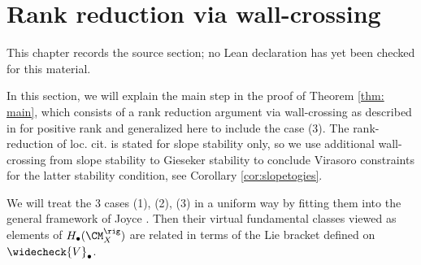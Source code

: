 \chapter{Rank reduction via wall-crossing}
\label{virasoro-constraints-moduli-sheaves-vertex-algebras-chapter-05}

\begin{remark}
\label{virasoro-constraints-moduli-sheaves-vertex-algebras-chapter-05-source}
This chapter records the source section; no Lean declaration has yet been checked for this material.
\notready
\end{remark}

\label{sec: rankreduction}

In this section, we will explain the main step in the proof of Theorem \ref{thm: main}, which consists of a rank reduction argument via wall-crossing as described in \cite[Section 8.6]{Jo21} for positive rank and generalized here to include the case (3). The rank-reduction of loc. cit. is stated for slope stability only, so we use additional wall-crossing from slope stability to Gieseker stability to conclude Virasoro constraints for the latter stability condition, see Corollary \ref{cor:slopetogies}.

We will treat the 3 cases (1), (2), (3) in a uniform way by fitting them into the general framework of Joyce \cite{Jo21}.  Then their virtual fundamental classes viewed as elements of $H_{\bullet}(\CM^{\rig}_X)$ are related in terms of the Lie bracket defined on $\widecheck{V}_\bullet$.

